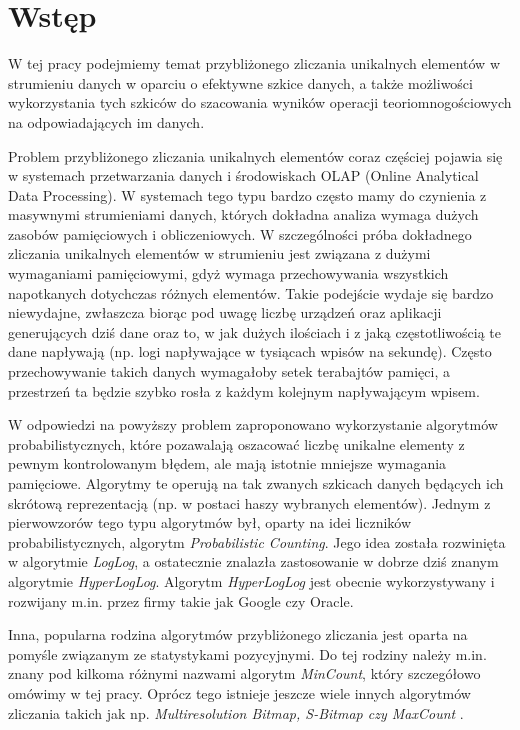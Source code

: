 \chapter{Wstęp}
\thispagestyle{chapterBeginStyle}

W tej pracy podejmiemy temat przybliżonego zliczania unikalnych elementów w strumieniu danych w oparciu o efektywne szkice danych, a także możliwości wykorzystania tych szkiców do szacowania wyników operacji teoriomnogościowych na odpowiadających im danych.

Problem przybliżonego zliczania unikalnych elementów coraz częściej pojawia się w systemach przetwarzania danych i środowiskach OLAP (Online Analytical Data Processing).
W systemach tego typu bardzo często mamy do czynienia z masywnymi strumieniami danych, których dokładna  analiza wymaga dużych zasobów pamięciowych i obliczeniowych. W szczególności próba dokładnego zliczania unikalnych elementów w strumieniu jest związana z dużymi wymaganiami pamięciowymi,  gdyż wymaga przechowywania wszystkich napotkanych dotychczas różnych elementów.
Takie podejście wydaje się bardzo niewydajne,
zwłaszcza biorąc pod uwagę liczbę urządzeń oraz aplikacji generujących dziś dane 
oraz to,  w jak dużych ilościach i z jaką częstotliwością te dane napływają
(np. logi napływające w tysiącach wpisów na sekundę).
Często przechowywanie takich danych wymagałoby
setek terabajtów pamięci, a przestrzeń ta będzie szybko rosła z każdym kolejnym napływającym wpisem.

W odpowiedzi na powyższy problem zaproponowano wykorzystanie algorytmów probabilistycznych, które pozawalają oszacować liczbę unikalne elementy z pewnym kontrolowanym błędem, ale mają istotnie mniejsze wymagania pamięciowe. Algorytmy te operują na tak zwanych szkicach danych będących ich skrótową reprezentacją (np. w postaci haszy wybranych elementów). Jednym z pierwowzorów tego typu algorytmów był, oparty na idei liczników probabilistycznych, algorytm \textit{Probabilistic Counting}. 
Jego idea została rozwinięta w algorytmie \textit{LogLog},
a ostatecznie znalazła zastosowanie w dobrze dziś znanym
algorytmie \textit{HyperLogLog}.
Algorytm \textit{HyperLogLog} jest obecnie wykorzystywany i rozwijany m.in. przez firmy takie 
jak Google czy Oracle.  

Inna, popularna rodzina algorytmów przybliżonego zliczania jest oparta na pomyśle związanym ze statystykami pozycyjnymi. Do tej rodziny należy m.in. znany pod kilkoma różnymi nazwami algorytm \textit{MinCount}, który szczegółowo omówimy w tej pracy. Oprócz tego istnieje jeszcze wiele innych algorytmów zliczania takich jak np. \textit{Multiresolution Bitmap, S-Bitmap czy MaxCount}
.

